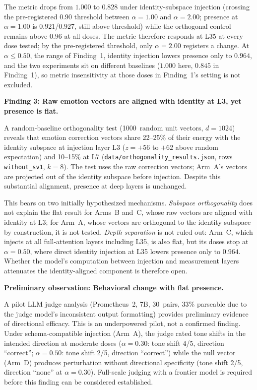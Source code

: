 \documentclass[11pt,a4paper]{article}
\begin{document}
The metric drops from $1.000$ to $0.828$ under identity-subspace injection
(crossing the pre-registered $0.90$ threshold between $\alpha{=}1.00$
and $\alpha{=}2.00$; presence at $\alpha{=}1.00$ is $0.921$/$0.927$,
still above threshold) while the orthogonal control remains above $0.96$
at all doses. The metric therefore responds at L35 at every dose
tested; by the pre-registered threshold, only $\alpha{=}2.00$ registers
a change. At $\alpha \le 0.50$, the range of Finding~1, identity
injection lowers presence only to $0.964$, and the two experiments sit on
different baselines ($1.000$ here, $0.845$ in Finding~1), so metric
insensitivity at those doses in Finding~1's setting is not excluded.

\textbf{Finding 3: Raw emotion vectors are aligned with identity at L3,
yet presence is flat.}

A random-baseline orthogonality test (1000~random unit vectors, $d{=}1024$)
reveals that emotion correction vectors share 22--25\% of their energy with
the identity subspace at injection layer L3 ($z{=}{+}56$ to ${+}62$
above random expectation) and 10--15\% at L7
(\nolinkurl{data/orthogonality_results.json}, rows \texttt{without\_sv1},
$k{=}8$). The test uses the raw correction vectors; Arm~A's vectors are
projected out of the identity subspace before injection. Despite this substantial alignment, presence at
deep layers is unchanged.

This bears on two initially hypothesized mechanisms. \emph{Subspace
orthogonality} does not explain the flat result for Arms~B and~C, whose
raw vectors are aligned with identity at L3; for Arm~A, whose vectors are
orthogonal to the identity subspace by construction, it is not tested.
\emph{Depth separation} is not ruled out: Arm~C, which injects at all
full-attention layers including L35, is also flat, but its doses stop at
$\alpha = 0.50$, where direct identity injection at L35 lowers presence
only to $0.964$. Whether the model's computation between injection and
measurement layers attenuates the identity-aligned component is
therefore open.

\textbf{Preliminary observation: Behavioral change with flat presence.}

A pilot LLM judge analysis (Prometheus~2, 7B, 30~pairs, 33\% parseable
due to the judge model's inconsistent output formatting) provides
preliminary evidence of directional efficacy. This is an underpowered
pilot, not a confirmed finding. Under schema-compatible
injection (Arm~A), the judge rated tone shifts in the intended direction at
moderate doses ($\alpha{=}0.30$: tone shift 4/5, direction ``correct'';
$\alpha{=}0.50$: tone shift 2/5, direction ``correct'') while the null
vector (Arm~D) produces perturbation without directional specificity
(tone shift 2/5, direction ``none'' at $\alpha{=}0.30$). Full-scale
judging with a frontier model is required before this finding can be
considered established.
\end{document}
